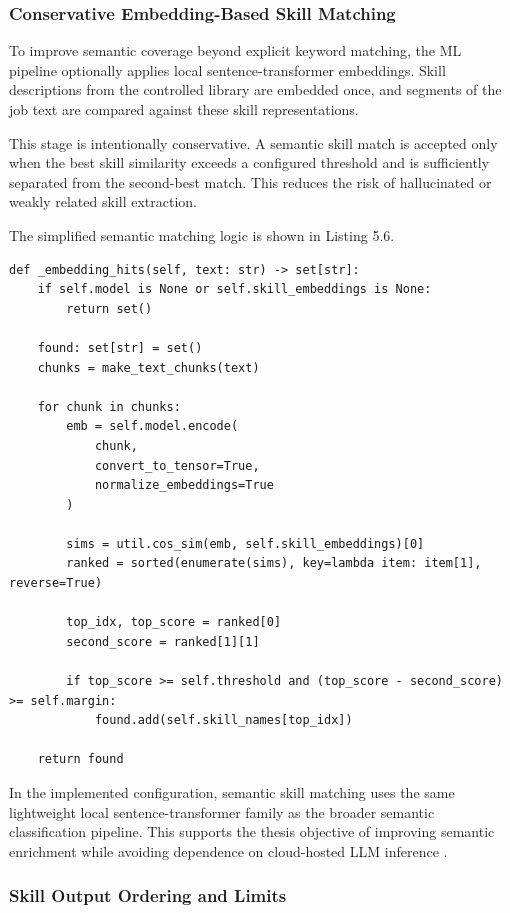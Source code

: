 \subsubsection*{Conservative Embedding-Based Skill Matching}

To improve semantic coverage beyond explicit keyword matching, the ML pipeline optionally applies local sentence-transformer embeddings. Skill descriptions from the controlled library are embedded once, and segments of the job text are compared against these skill representations.

This stage is intentionally conservative. A semantic skill match is accepted only when the best skill similarity exceeds a configured threshold and is sufficiently separated from the second-best match. This reduces the risk of hallucinated or weakly related skill extraction.

The simplified semantic matching logic is shown in Listing 5.6.

\begin{lstlisting}[caption={Conservative semantic skill matching}]
def _embedding_hits(self, text: str) -> set[str]:
    if self.model is None or self.skill_embeddings is None:
        return set()

    found: set[str] = set()
    chunks = make_text_chunks(text)

    for chunk in chunks:
        emb = self.model.encode(
            chunk,
            convert_to_tensor=True,
            normalize_embeddings=True
        )

        sims = util.cos_sim(emb, self.skill_embeddings)[0]
        ranked = sorted(enumerate(sims), key=lambda item: item[1], reverse=True)

        top_idx, top_score = ranked[0]
        second_score = ranked[1][1]

        if top_score >= self.threshold and (top_score - second_score) >= self.margin:
            found.add(self.skill_names[top_idx])

    return found
\end{lstlisting}

In the implemented configuration, semantic skill matching uses the same lightweight local sentence-transformer family as the broader semantic classification pipeline. This supports the thesis objective of improving semantic enrichment while avoiding dependence on cloud-hosted LLM inference \cite{reimers2019sentence, schwartz2020green}.

\subsubsection*{Skill Output Ordering and Limits}

